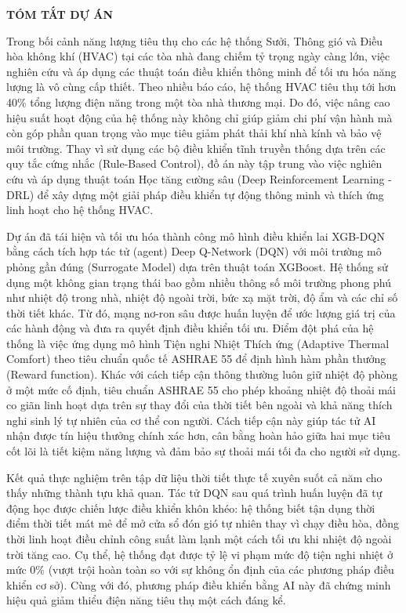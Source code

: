 \begin{center}
    \LARGE \textbf{TÓM TẮT DỰ ÁN}
\end{center}
\vspace{0.5cm}

Trong bối cảnh năng lượng tiêu thụ cho các hệ thống Sưởi, Thông gió và Điều hòa không khí (HVAC) tại các tòa nhà đang chiếm tỷ trọng ngày càng lớn, việc nghiên cứu và áp dụng các thuật toán điều khiển thông minh để tối ưu hóa năng lượng là vô cùng cấp thiết. Theo nhiều báo cáo, hệ thống HVAC tiêu thụ tới hơn 40\% tổng lượng điện năng trong một tòa nhà thương mại. Do đó, việc nâng cao hiệu suất hoạt động của hệ thống này không chỉ giúp giảm chi phí vận hành mà còn góp phần quan trọng vào mục tiêu giảm phát thải khí nhà kính và bảo vệ môi trường. Thay vì sử dụng các bộ điều khiển tĩnh truyền thống dựa trên các quy tắc cứng nhắc (Rule-Based Control), đồ án này tập trung vào việc nghiên cứu và áp dụng thuật toán Học tăng cường sâu (Deep Reinforcement Learning - DRL) để xây dựng một giải pháp điều khiển tự động thông minh và thích ứng linh hoạt cho hệ thống HVAC.

Dự án đã tái hiện và tối ưu hóa thành công mô hình điều khiển lai XGB-DQN bằng cách tích hợp tác tử (agent) Deep Q-Network (DQN) với môi trường mô phỏng gần đúng (Surrogate Model) dựa trên thuật toán XGBoost. Hệ thống sử dụng một không gian trạng thái bao gồm nhiều thông số môi trường phong phú như nhiệt độ trong nhà, nhiệt độ ngoài trời, bức xạ mặt trời, độ ẩm và các chỉ số thời tiết khác. Từ đó, mạng nơ-ron sâu được huấn luyện để ước lượng giá trị của các hành động và đưa ra quyết định điều khiển tối ưu. Điểm đột phá của hệ thống là việc ứng dụng mô hình Tiện nghi Nhiệt Thích ứng (Adaptive Thermal Comfort) theo tiêu chuẩn quốc tế ASHRAE 55 để định hình hàm phần thưởng (Reward function). Khác với cách tiếp cận thông thường luôn giữ nhiệt độ phòng ở một mức cố định, tiêu chuẩn ASHRAE 55 cho phép khoảng nhiệt độ thoải mái co giãn linh hoạt dựa trên sự thay đổi của thời tiết bên ngoài và khả năng thích nghi sinh lý tự nhiên của cơ thể con người. Cách tiếp cận này giúp tác tử AI nhận được tín hiệu thưởng chính xác hơn, cân bằng hoàn hảo giữa hai mục tiêu cốt lõi là tiết kiệm năng lượng và đảm bảo sự thoải mái tối đa cho người sử dụng.

Kết quả thực nghiệm trên tập dữ liệu thời tiết thực tế xuyên suốt cả năm cho thấy những thành tựu khả quan. Tác tử DQN sau quá trình huấn luyện đã tự động học được chiến lược điều khiển khôn khéo: hệ thống biết tận dụng thời điểm thời tiết mát mẻ để mở cửa sổ đón gió tự nhiên thay vì chạy điều hòa, đồng thời linh hoạt điều chỉnh công suất làm lạnh một cách tối ưu khi nhiệt độ ngoài trời tăng cao. Cụ thể, hệ thống đạt được tỷ lệ vi phạm mức độ tiện nghi nhiệt ở mức 0\% (vượt trội hoàn toàn so với sự không ổn định của các phương pháp điều khiển cơ sở). Cùng với đó, phương pháp điều khiển bằng AI này đã chứng minh hiệu quả giảm thiểu điện năng tiêu thụ một cách đáng kể. 

